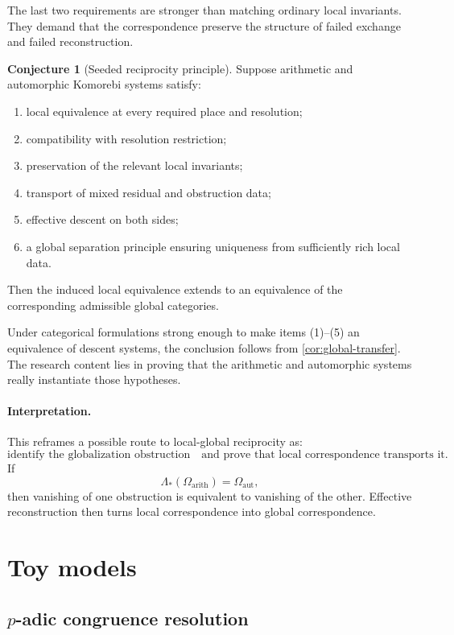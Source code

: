 \documentclass[11pt]{article}
\theoremstyle{definition}
\newtheorem{conjecture}[theorem]{Conjecture}
\theoremstyle{remark}
\begin{document}
The last two requirements are stronger than matching ordinary local invariants. They demand that the correspondence preserve the structure of failed exchange and failed reconstruction.

\begin{conjecture}[Seeded reciprocity principle]\label{conj:seeded-reciprocity}
Suppose arithmetic and automorphic Komorebi systems satisfy:
\begin{enumerate}
    \item local equivalence at every required place and resolution;
    \item compatibility with resolution restriction;
    \item preservation of the relevant local invariants;
    \item transport of mixed residual and obstruction data;
    \item effective descent on both sides;
    \item a global separation principle ensuring uniqueness from sufficiently rich local data.
\end{enumerate}
Then the induced local equivalence extends to an equivalence of the corresponding admissible global categories.
\end{conjecture}

Under categorical formulations strong enough to make items (1)--(5) an equivalence of descent systems, the conclusion follows from \cref{cor:global-transfer}. The research content lies in proving that the arithmetic and automorphic systems really instantiate those hypotheses.

\paragraph{Interpretation.}
This reframes a possible route to local-global reciprocity as:
\[
\boxed{
\text{identify the globalization obstruction}
\quad\text{and prove that local correspondence transports it.}
}
\]
If
\[
\Lambda_*(\Omega_{\mathrm{arith}})=\Omega_{\mathrm{aut}},
\]
then vanishing of one obstruction is equivalent to vanishing of the other. Effective reconstruction then turns local correspondence into global correspondence.

\section{Toy models}

\subsection{$p$-adic congruence resolution}
\end{document}
